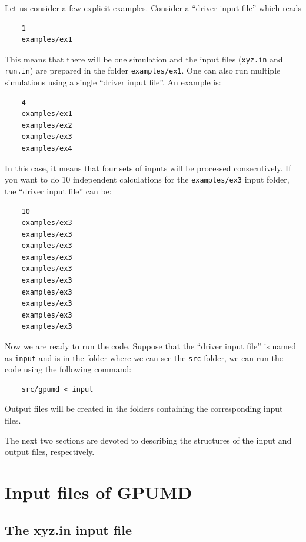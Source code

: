 \documentclass[12pt,a4paper]{report}
\begin{document}
Let us consider a few explicit examples. Consider a ``driver input file'' which reads
\begin{verbatim}
    1
    examples/ex1
\end{verbatim}
This means that there will be one simulation and the input files (\verb"xyz.in" and \verb"run.in") are prepared in the folder \verb"examples/ex1". One can also run multiple simulations using a single ``driver input file''. An example is:
\begin{verbatim}
    4
    examples/ex1
    examples/ex2
    examples/ex3
    examples/ex4
\end{verbatim}
In this case, it means that four sets of inputs will be processed consecutively. If you want to do 10 independent calculations for the \verb"examples/ex3" input folder, the ``driver input file'' can be:
\begin{verbatim}
    10
    examples/ex3
    examples/ex3
    examples/ex3
    examples/ex3
    examples/ex3
    examples/ex3
    examples/ex3
    examples/ex3
    examples/ex3
    examples/ex3
\end{verbatim}

Now we are ready to run the code. Suppose that the ``driver input file'' is named as \verb"input" and is in the folder where we can see the \verb"src" folder, we can run the code using the following command:
\begin{verbatim}
    src/gpumd < input
\end{verbatim}
Output files will be created in the folders containing the corresponding input files.

The next two sections are devoted to describing the structures of the input and output files, respectively.




\section{Input files of GPUMD}


\subsection{The xyz.in input file}
\end{document}
